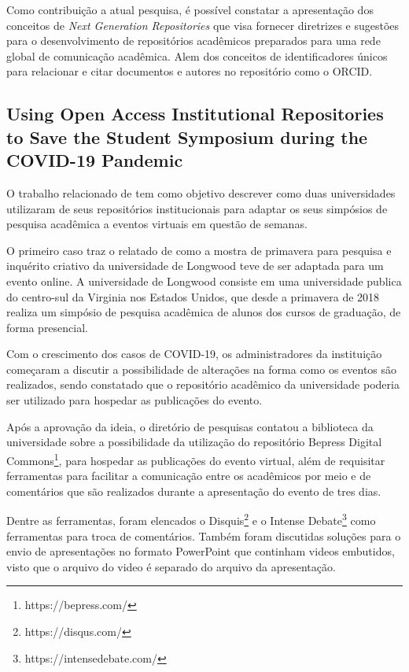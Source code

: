 Como contribuição a atual pesquisa, é possível constatar a apresentação dos
conceitos de \emph{Next Generation Repositories} que visa fornecer diretrizes
e sugestões para o desenvolvimento de repositórios acadêmicos preparados
para uma rede global de comunicação acadêmica. Alem dos conceitos de identificadores
únicos para relacionar e citar documentos e autores no repositório como o ORCID.

\subsection{Using Open Access Institutional Repositories to Save the Student Symposium during the COVID-19 Pandemic}

O trabalho relacionado de \cite{Symulevich:2022} tem como objetivo
descrever como duas universidades utilizaram de seus repositórios
institucionais para adaptar os seus simpósios de pesquisa acadêmica
a eventos virtuais em questão de semanas.

O primeiro caso traz o relatado de como a mostra de primavera para pesquisa e
inquérito criativo da universidade de Longwood teve de ser adaptada para um
evento online. A universidade de Longwood consiste em uma universidade publica
do centro-sul da Virginia nos Estados Unidos, que desde a primavera de 2018
realiza um simpósio de pesquisa acadêmica de alunos dos cursos de graduação,
de forma presencial.

Com o crescimento dos casos de COVID-19, os administradores da instituição
começaram a discutir a possibilidade de alterações na forma como os eventos
são realizados, sendo constatado que o repositório acadêmico da universidade
poderia ser utilizado para hospedar as publicações do evento.

Após a aprovação da ideia, o diretório de pesquisas contatou a biblioteca da universidade sobre
a possibilidade da utilização do repositório Bepress Digital Commons\footnote{https://bepress.com/},
para hospedar as publicações do evento virtual, além de requisitar ferramentas
para facilitar a comunicação entre os acadêmicos por meio e de comentários
que são realizados durante a apresentação do evento de tres dias.

Dentre as ferramentas, foram elencados o Disquis\footnote{https://disqus.com/}
e o Intense Debate\footnote{https://intensedebate.com/} como ferramentas para troca
de comentários. Também foram discutidas soluções para o envio de apresentações
no formato PowerPoint que continham videos embutidos, visto que o arquivo do video
é separado do arquivo da apresentação.

